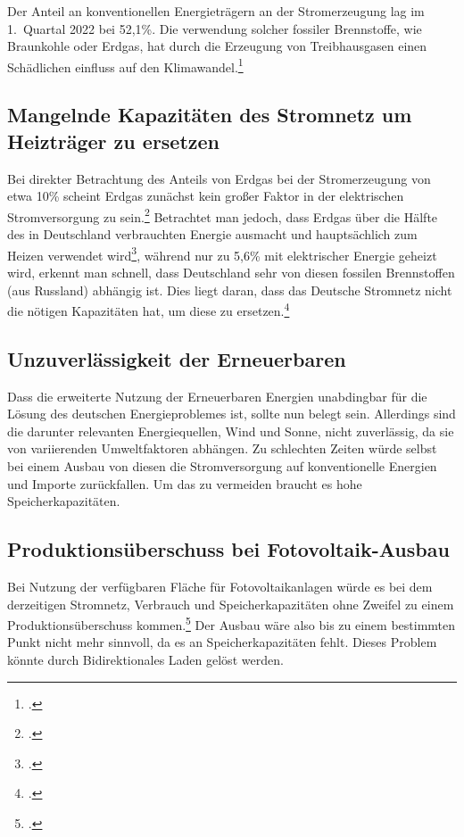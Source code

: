 \documentclass[12pt]{article}
\begin{document}
    Der Anteil an konventionellen Energieträgern an der Stromerzeugung lag im 1.\ Quartal 2022 bei 52,1\%.
    Die verwendung solcher fossiler Brennstoffe, wie Braunkohle oder Erdgas, hat durch die Erzeugung von
    Treibhausgasen einen Schädlichen einfluss auf den Klimawandel.\footcite{wilkeErneuerbareUndKonventionelle2013}
    
    \subsection{Mangelnde Kapazitäten des Stromnetz um Heizträger zu ersetzen}
    Bei direkter Betrachtung des Anteils von Erdgas bei der Stromerzeugung von etwa 10\% scheint Erdgas zunächst
    kein großer Faktor in der elektrischen Stromversorgung zu sein.\footcite{SMARDHoherEEAnteil, EnergieWofurErdgas}
    Betrachtet man jedoch, dass Erdgas über die Hälfte des in Deutschland verbrauchten
    Energie ausmacht und hauptsächlich zum Heizen verwendet wird\footcite{Anwendungsbereiche, EnergieWofurErdgas},
    während nur zu 5,6\% mit elektrischer Energie geheizt wird, erkennt man schnell, dass Deutschland sehr von diesen
    fossilen Brennstoffen (aus Russland) abhängig ist.
    Dies liegt daran, dass das Deutsche Stromnetz nicht die nötigen Kapazitäten hat, um diese zu
    ersetzen.\footcite{EnergieWofurErdgas}
    
    \subsection{Unzuverlässigkeit der Erneuerbaren}
    Dass die erweiterte Nutzung der Erneuerbaren Energien unabdingbar für die Lösung des deutschen Energieproblemes
    ist, sollte nun belegt sein. Allerdings sind die darunter relevanten Energiequellen, Wind und Sonne, nicht
    zuverlässig, da sie von variierenden Umweltfaktoren abhängen. Zu schlechten Zeiten würde selbst bei einem Ausbau
    von diesen die Stromversorgung auf konventionelle Energien und Importe zurückfallen. Um das zu vermeiden braucht
    es hohe Speicherkapazitäten.

    \subsection{Produktionsüberschuss bei Fotovoltaik-Ausbau}
    Bei Nutzung der verfügbaren Fläche für Fotovoltaikanlagen würde es bei dem derzeitigen Stromnetz, Verbrauch und
    Speicherkapazitäten ohne Zweifel zu einem Produktionsüberschuss kommen.\footcite{wirthAktuelleFaktenZur}
    Der Ausbau wäre also bis zu einem bestimmten Punkt nicht mehr sinnvoll, da es an Speicherkapazitäten fehlt.
    Dieses Problem könnte durch Bidirektionales Laden gelöst werden.
\end{document}
